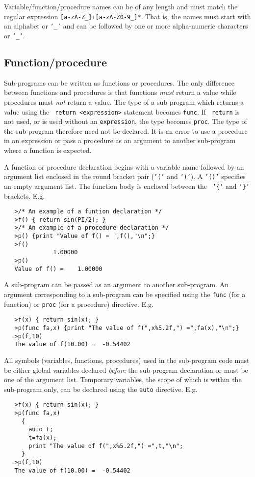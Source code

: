 \documentclass[11pt]{article}
\begin{document}
Variable/function/procedure names can be of any length and must match
the regular expression {\tt [a-zA-Z\_]+[a-zA-Z0-9\_]*}.  That is, the
names must start with an alphabet or {\tt '\_'} and can be followed by
one or more alpha-numeric characters or {\tt '\_'}.

\subsection{Function/procedure}
\label{APPEN:SYNTAX_FUNC}

Sub-programs can be written as functions or procedures.  The only
difference between functions and procedures is that functions {\it
must} return a value while procedures must {\it not} return a value.
The type of a sub-program which returns a value using the {\tt
return}~{\tt <expression>} statement becomes {\tt func}.  If {\tt
return} is not used, or is used without an {\tt expression}, the type
becomes {\tt proc}.  The type of the sub-program therefore need not be
declared.  It is an error to use a procedure in an expression or pass
a procedure as an argument to another sub-program where a function
is expected.

A function or procedure declaration begins with a variable name followed by an argument
list enclosed in the round bracket pair ({\tt '('} and {\tt ')'}).  A {\tt '()'}
specifies an empty argument list.  The function body is enclosed between the {\tt
  '\{'} and {\tt '\}'} brackets.  E.g.
\begin{verbatim}
   >/* An example of a funtion declaration */
   >f() { return sin(PI/2); }
   >/* An example of a procedure declaration */ 
   >p() {print "Value of f() = ",f(),"\n";}
   >f()
              1.00000
   >p() 
   Value of f() =    1.00000
\end{verbatim}
A sub-program can be passed as an argument to another sub-program.  An
argument corresponding to a sub-program can be specified using the
{\tt func} (for a function) or {\tt proc} (for a procedure) directive.
E.g.
\begin{verbatim}
   >f(x) { return sin(x); }
   >p(func fa,x) {print "The value of f(",x%5.2f,") =",fa(x),"\n";}
   >p(f,10)
   The value of f(10.00) =  -0.54402
\end{verbatim}
All symbols (variables, functions, procedures) used in the sub-program
code must be either global variables declared {\it before} the
sub-program declaration or must be one of the argument list.
Temporary variables, the scope of which is within the sub-program
only, can be declared using the {\tt auto} directive.  E.g.
\begin{verbatim}
   >f(x) { return sin(x); }
   >p(func fa,x)
     {
       auto t;
       t=fa(x);
       print "The value of f(",x%5.2f,") =",t,"\n";
     }
   >p(f,10)
   The value of f(10.00) =  -0.54402
\end{verbatim}
\end{document}
